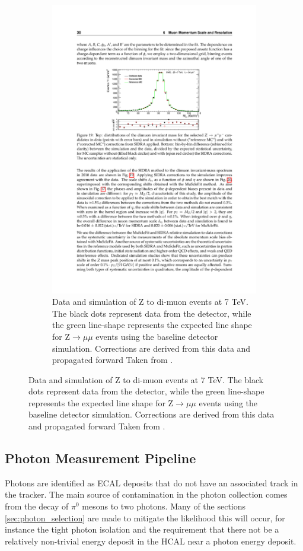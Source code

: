 \begin{figure}[!htb]
\begin{subfigure}[t]{0.48\textwidth}
        \includegraphics[width=\textwidth]{figures/muon_Z_resolution.pdf}
        \caption{Data and simulation of Z to di-muon events at 7 TeV. The black dots represent data from the detector, while the green line-shape represents the expected line shape for Z$\to\mu\mu$ events using the baseline detector simulation. Corrections are derived from this data and propagated forward Taken from \cite{cms_muons}.}
        \label{fig:muon_Z_resolution}
      \end{subfigure}
    \end{figure}

    \FloatBarrier

  \subsection{Photon Measurement Pipeline} \label{sec:photon_measurement_pipeline}
    Photons are identified as ECAL deposits that do not have an associated track in the tracker. The main source of contamination in the photon collection comes from the decay of $\pi^0$ mesons to two photons.\cite{cms_photons} Many of the sections \ref{sec:photon_selection} are made to mitigate the likelihood this will occur, for instance the tight photon isolation and the requirement that there not be a relatively non-trivial energy deposit in the HCAL near a photon energy deposit.

